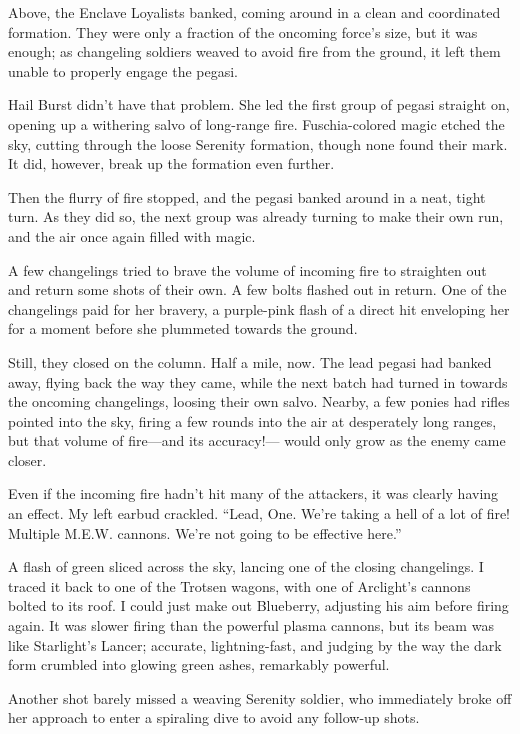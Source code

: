 Above, the Enclave Loyalists banked, coming around in a clean and coordinated formation. They were only a fraction of the oncoming force’s size, but it was enough; as changeling soldiers weaved to avoid fire from the ground, it left them unable to properly engage the pegasi.

Hail Burst didn’t have that problem. She led the first group of pegasi straight on, opening up a withering salvo of long-range fire. Fuschia-colored magic etched the sky, cutting through the loose Serenity formation, though none found their mark. It did, however, break up the formation even further.

Then the flurry of fire stopped, and the pegasi banked around in a neat, tight turn. As they did so, the next group was already turning to make their own run, and the air once again filled with magic.

A few changelings tried to brave the volume of incoming fire to straighten out and return some shots of their own. A few bolts flashed out in return. One of the changelings paid for her bravery, a purple-pink flash of a direct hit enveloping her for a moment before she plummeted towards the ground.

Still, they closed on the column. Half a mile, now. The lead pegasi had banked away, flying back the way they came, while the next batch had turned in towards the oncoming changelings, loosing their own salvo. Nearby, a few ponies had rifles pointed into the sky, firing a few rounds into the air at desperately long ranges, but that volume of fire—and its accuracy!— would only grow as the enemy came closer.

Even if the incoming fire hadn’t hit many of the attackers, it was clearly having an effect. My left earbud crackled. “Lead, One. We’re taking a hell of a lot of fire! Multiple M.E.W. cannons. We’re not going to be effective here.”

A flash of green sliced across the sky, lancing one of the closing changelings. I traced it back to one of the Trotsen wagons, with one of Arclight’s cannons bolted to its roof. I could just make out Blueberry, adjusting his aim before firing again. It was slower firing than the powerful plasma cannons, but its beam was like Starlight’s Lancer; accurate, lightning-fast, and judging by the way the dark form crumbled into glowing green ashes, remarkably powerful.

Another shot barely missed a weaving Serenity soldier, who immediately broke off her approach to enter a spiraling dive to avoid any follow-up shots.

